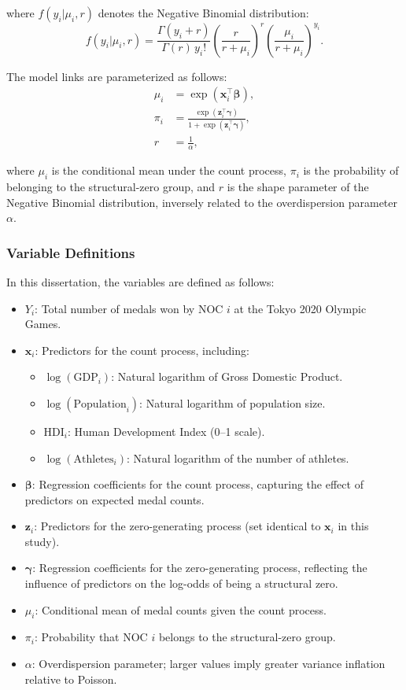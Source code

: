 \documentclass[11pt,twoside]{article}
\numberwithin{Theorem}{section}
\numberwithin{Definition}{section}
\numberwithin{Lemma}{section}
\numberwithin{Algorithm}{section}
\numberwithin{equation}{section}
\begin{document}
where $f(y_i|\mu_i,r)$ denotes the Negative Binomial distribution:  
\[
f(y_i|\mu_i,r) = \frac{\Gamma(y_i + r)}{\Gamma(r)\,y_i!}
\left(\frac{r}{r+\mu_i}\right)^{r}
\left(\frac{\mu_i}{r+\mu_i}\right)^{y_i}.
\]

The model links are parameterized as follows:  
\begin{align}
\mu_i &= \exp(\mathbf{x}_i^\top \boldsymbol{\beta}), \label{eq:zinb_mu} \\
\pi_i &= \frac{\exp(\mathbf{z}_i^\top \boldsymbol{\gamma})}{1 + \exp(\mathbf{z}_i^\top \boldsymbol{\gamma})}, \label{eq:zinb_pi} \\
r &= \frac{1}{\alpha}, \label{eq:zinb_r}
\end{align}

where $\mu_i$ is the conditional mean under the count process, $\pi_i$ is the probability of belonging to the structural-zero group, and $r$ is the shape parameter of the Negative Binomial distribution, inversely related to the overdispersion parameter $\alpha$.

\subsubsection{Variable Definitions}

In this dissertation, the variables are defined as follows:  
\begin{itemize}
    \item $Y_i$: Total number of medals won by NOC $i$ at the Tokyo 2020 Olympic Games.  
    \item $\mathbf{x}_i$: Predictors for the count process, including:  
    \begin{itemize}
        \item $\log(\mathrm{GDP}_i)$: Natural logarithm of Gross Domestic Product.  
        \item $\log(\mathrm{Population}_i)$: Natural logarithm of population size.  
        \item $\mathrm{HDI}_i$: Human Development Index (0--1 scale).  
        \item $\log(\mathrm{Athletes}_i)$: Natural logarithm of the number of athletes.  
    \end{itemize}
    \item $\boldsymbol{\beta}$: Regression coefficients for the count process, capturing the effect of predictors on expected medal counts.  
    \item $\mathbf{z}_i$: Predictors for the zero-generating process (set identical to $\mathbf{x}_i$ in this study).  
    \item $\boldsymbol{\gamma}$: Regression coefficients for the zero-generating process, reflecting the influence of predictors on the log-odds of being a structural zero.  
    \item $\mu_i$: Conditional mean of medal counts given the count process.  
    \item $\pi_i$: Probability that NOC $i$ belongs to the structural-zero group.  
    \item $\alpha$: Overdispersion parameter; larger values imply greater variance inflation relative to Poisson.  
\end{itemize}
\end{document}
